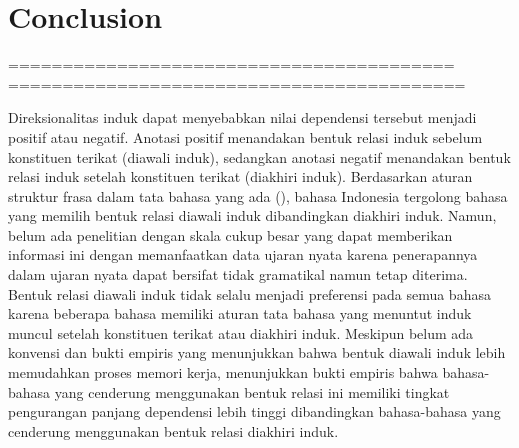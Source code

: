 \documentclass[10pt, a4paper, conference, compsocconf]{IEEEtran}
\begin{document}
%





\section{Conclusion}

=========================================
==========================================

Direksionalitas induk dapat menyebabkan nilai dependensi tersebut menjadi positif atau negatif. Anotasi positif menandakan bentuk relasi induk sebelum konstituen terikat (diawali induk), sedangkan anotasi negatif menandakan bentuk relasi induk setelah konstituen terikat (diakhiri induk). Berdasarkan aturan struktur frasa dalam tata bahasa yang ada (\citealp{kridalaksana2002struktur, sneddon2010indonesian}), bahasa Indonesia tergolong bahasa yang memilih bentuk relasi diawali induk dibandingkan diakhiri induk. Namun, belum ada penelitian dengan skala cukup besar yang dapat memberikan informasi ini dengan memanfaatkan data ujaran nyata karena penerapannya dalam ujaran nyata dapat bersifat tidak gramatikal namun tetap diterima. Bentuk relasi diawali induk tidak selalu menjadi preferensi pada semua bahasa karena beberapa bahasa memiliki aturan tata bahasa yang menuntut induk muncul setelah konstituen terikat atau diakhiri induk. Meskipun belum ada konvensi dan bukti empiris yang menunjukkan bahwa bentuk diawali induk lebih memudahkan proses memori kerja, \cite{futrell2015large} menunjukkan bukti empiris bahwa bahasa-bahasa yang cenderung menggunakan bentuk relasi ini memiliki tingkat pengurangan panjang dependensi lebih tinggi dibandingkan bahasa-bahasa yang cenderung menggunakan bentuk relasi diakhiri induk. 
\end{document}

